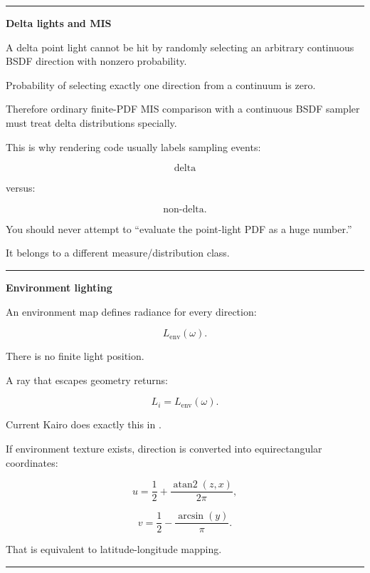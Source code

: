 \begin{center}\rule{0.5\linewidth}{0.5pt}\end{center}

\textbf{Delta lights and MIS}

A delta point light cannot be hit by randomly selecting an arbitrary continuous BSDF direction with nonzero probability.

Probability of selecting exactly one direction from a continuum is zero.

Therefore ordinary finite-PDF MIS comparison with a continuous BSDF sampler must treat delta distributions specially.

This is why rendering code usually labels sampling events:

\[
\text{delta}
\]

versus:

\[
\text{non-delta}.
\]

You should never attempt to ``evaluate the point-light PDF as a huge number.''

It belongs to a different measure/distribution class.

\begin{center}\rule{0.5\linewidth}{0.5pt}\end{center}

\textbf{Environment lighting}

An environment map defines radiance for every direction:

\[
L_{\text{env}}(\omega).
\]

There is no finite light position.

A ray that escapes geometry returns:

\[
\boxed{
L_i=
L_{\text{env}}(\omega).
}
\]

Current Kairo does exactly this in .

If environment texture exists, direction is converted into equirectangular coordinates:

\[
u=
\frac12+
\frac{
\operatorname{atan2}(z,x)
}{
2\pi
},
\]

\[
v=
\frac12-
\frac{
\arcsin(y)
}{
\pi
}.
\]

That is equivalent to latitude-longitude mapping.

\begin{center}\rule{0.5\linewidth}{0.5pt}\end{center}

